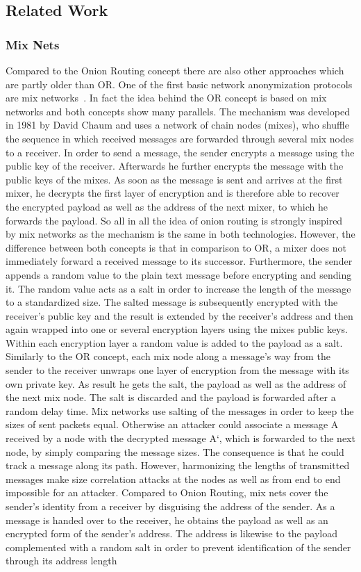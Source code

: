 \documentclass{sig-alternate}
\begin{document}
\subsection {Related Work}
 \subsubsection {Mix Nets}
Compared to the Onion Routing concept there are also other approaches which are partly older than OR. One of the first basic network anonymization protocols are mix networks~\cite{chaum1981untraceable}. In fact the idea behind the OR concept is based on mix networks and both concepts show many parallels. The mechanism was developed in 1981 by David Chaum and uses a network of chain nodes (mixes), who shuffle the sequence in which received messages are forwarded through several mix nodes to a receiver. In order to send a message, the sender encrypts a message using the public key of the receiver. Afterwards he further encrypts the message with the public keys of the mixes. As soon as the message is sent and arrives at the first mixer, he decrypts the first layer of encryption and is therefore able to recover the encrypted payload as well as the address of the next mixer, to which he forwards the payload. So all in all the idea of onion routing is strongly inspired by mix networks as the mechanism is the same in both technologies. However, the difference between both concepts is that in comparison to OR, a mixer does not immediately forward a received message to its successor. Furthermore, the sender appends a random value to the plain text message before encrypting and sending it. The random value acts as a salt in order to increase the length of the message to a standardized size. The salted message is subsequently encrypted with the receiver's public key and the result is extended by the receiver's address and then again wrapped into one or several encryption layers using the mixes public keys. Within each encryption layer a random value is added to the payload as a salt. Similarly to the OR concept, each mix node along a message's way from the sender to the receiver unwraps one layer of encryption from the message with its own private key. As result he gets the salt, the payload as well as the address of the next mix node. The salt is discarded and the payload is forwarded after a random delay time. Mix networks use salting of the messages in order to keep the sizes of sent packets equal. Otherwise an attacker could associate a message A received by a node with the decrypted message A`, which is forwarded to the next node, by simply comparing the message sizes. The consequence is that he could track a message along its path. However, harmonizing the lengths of transmitted messages make size correlation attacks at the nodes as well as from end to end impossible for an attacker. Compared to Onion Routing, mix nets cover the sender's identity from a receiver by disguising the address of the sender. As a message is handed over to the receiver, he obtains the payload as well as an encrypted form of the sender's address. The address is likewise to the payload complemented with a random salt in order to prevent identification of the sender through its address length 
\end{document}
